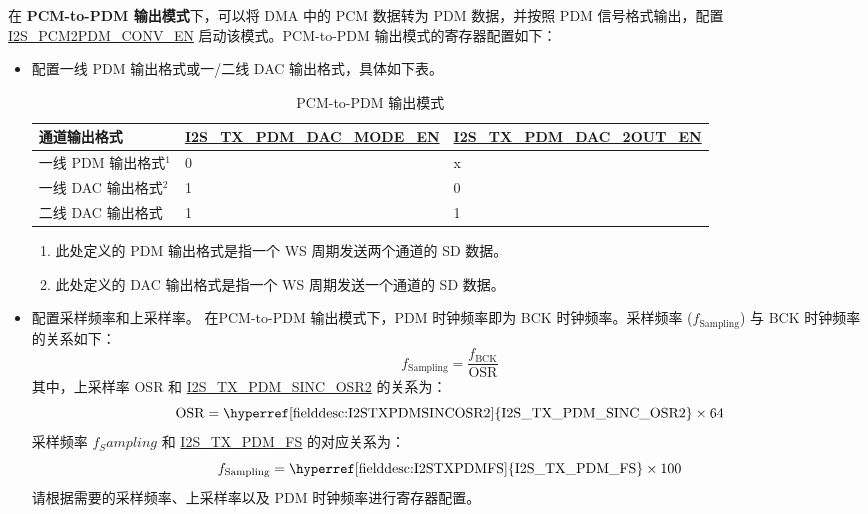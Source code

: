 \documentclass[main\_\_CN.tex]{subfiles}
\begin{document}
在 \textbf{PCM-to-PDM 输出模式}下，可以将 DMA 中的 PCM 数据转为 PDM 数据，并按照 PDM 信号格式输出，配置 \hyperref[fielddesc:I2SPCM2PDMCONVEN]{I2S\_PCM2PDM\_CONV\_EN} 启动该模式。PCM-to-PDM 输出模式的寄存器配置如下：
\begin{itemize}
    \item 配置一线 PDM 输出格式或一/二线 DAC 输出格式，具体如下表。
\begin{table}[H]
    \centering
    \caption{PCM-to-PDM 输出模式}
    \label{tab:i2s-pcm-pdm-output-mode}
    \begin{tabular}{|p{4.3cm}|R{5.0cm}|R{4.8cm}|}
    \hline
    \textbf{通道输出格式}&\textbf{\hyperref[fielddesc:I2STXPDMDACMODEEN]{I2S\_TX\_PDM\_DAC\_MODE\_EN}} & \textbf{\hyperref[fielddesc:I2STXPDMDAC2OUTEN]{I2S\_TX\_PDM\_DAC\_2OUT\_EN}}\\ \hline
    一线 PDM 输出格式\hyperref[note-1]{$^1$}& 0 & x \\ \hline
    一线 DAC 输出格式\hyperref[note-2]{$^2$} &1   & 0  \\ \hline 
    二线 DAC 输出格式 & 1 & 1 \\ \hline
    \end{tabular}
\end{table} 
\begin{tiplisting}
\vspace{-2em}
\begin{enumerate}
    \item \label{note-1} 此处定义的 PDM 输出格式是指一个 WS 周期发送两个通道的 SD 数据。
    \item \label{note-2} 此处定义的 DAC 输出格式是指一个 WS 周期发送一个通道的 SD 数据。
\end{enumerate}
\end{tiplisting}
\vspace{-1em}
    \item 配置采样频率和上采样率。\newline
    在PCM-to-PDM 输出模式下，PDM 时钟频率即为 BCK 时钟频率。采样频率 ($f_{\textrm{Sampling}}$) 与 BCK 时钟频率的关系如下：
    $$f_{\textrm{Sampling}} = \frac{f_{\textrm{BCK}}}{\textrm{OSR}}$$
    其中，上采样率 OSR 和 \hyperref[fielddesc:I2STXPDMSINCOSR2]{I2S\_TX\_PDM\_SINC\_OSR2} 的关系为：
    $${\textrm{OSR}} = {\textrm{\hyperref[fielddesc:I2STXPDMSINCOSR2]{I2S\_TX\_PDM\_SINC\_OSR2}}} \times {\textrm{64}}$$
    采样频率 $f_Sampling$ 和 \hyperref[fielddesc:I2STXPDMFS]{I2S\_TX\_PDM\_FS} 的对应关系为：
    $$f_{\textrm{Sampling}} = {\textrm{\hyperref[fielddesc:I2STXPDMFS]{I2S\_TX\_PDM\_FS}}} \times {\textrm{100}}$$
    请根据需要的采样频率、上采样率以及 PDM 时钟频率进行寄存器配置。
\end{itemize}
\end{document}
